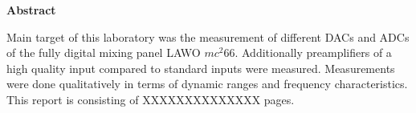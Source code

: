 \documentclass[11pt]{report}
\begin{document}


\newpage
{}
\vspace*{2.2 cm}
{\Large
\noindent
{\bf Abstract}} \\
\vspace*{0.3 cm}

\noindent
Main target of this laboratory was the measurement of different DACs and ADCs of the fully digital mixing panel LAWO $mc^2 66$. Additionally preamplifiers of a high quality input compared to standard inputs were measured. Measurements were done qualitatively in terms of dynamic ranges and frequency characteristics.\\
This report is consisting of XXXXXXXXXXXXXX pages. 











\newpage
{}



\end{document}
